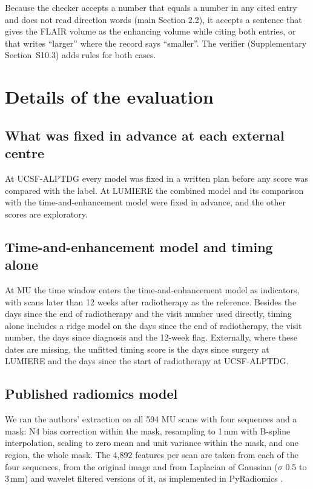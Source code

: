 \documentclass[11pt,a4paper]{article}
\begin{document}
Because the checker accepts a number that equals a number in any cited entry and does not read direction words
(main Section 2.2), it accepts a sentence that gives the FLAIR volume as the enhancing volume while citing both
entries, or that writes ``larger'' where the record says ``smaller''. The verifier (Supplementary Section~S10.3) adds rules for both
cases.

\FloatBarrier
\section{Details of the evaluation}\label{sec:S30}

\subsection{What was fixed in advance at each external centre}\label{sec:S30.1}

At UCSF-ALPTDG every model was fixed in a written plan before any score was compared with the label. At LUMIERE the
combined model and its comparison with the time-and-enhancement model were fixed in advance, and the other scores are
exploratory.

\subsection{Time-and-enhancement model and timing alone}\label{sec:S30.2}

At MU the time window enters the time-and-enhancement model as indicators, with scans later than 12 weeks after
radiotherapy as the reference. Besides the days since the end of radiotherapy and the visit number used directly,
timing alone includes a ridge model on the days since the end of radiotherapy, the visit number, the days since
diagnosis and the 12-week flag. Externally, where these dates are missing, the unfitted timing score is the days
since surgery at LUMIERE and the days since the start of radiotherapy at UCSF-ALPTDG.

\subsection{Published radiomics model}\label{sec:S30.3}

We ran the authors' extraction on all 594 MU scans with four sequences and a mask: N4 bias correction \citep{tustison2010} within the mask,
resampling to 1\,mm with B-spline interpolation, scaling to zero mean and unit variance within the mask, and one
region, the whole mask. The 4,892 features per scan are taken from each of the four sequences, from the original image
and from Laplacian of Gaussian ($\sigma$ 0.5 to 3\,mm) and wavelet filtered versions of it, as implemented in PyRadiomics \citep{vangriethuysen2017}.
\end{document}
